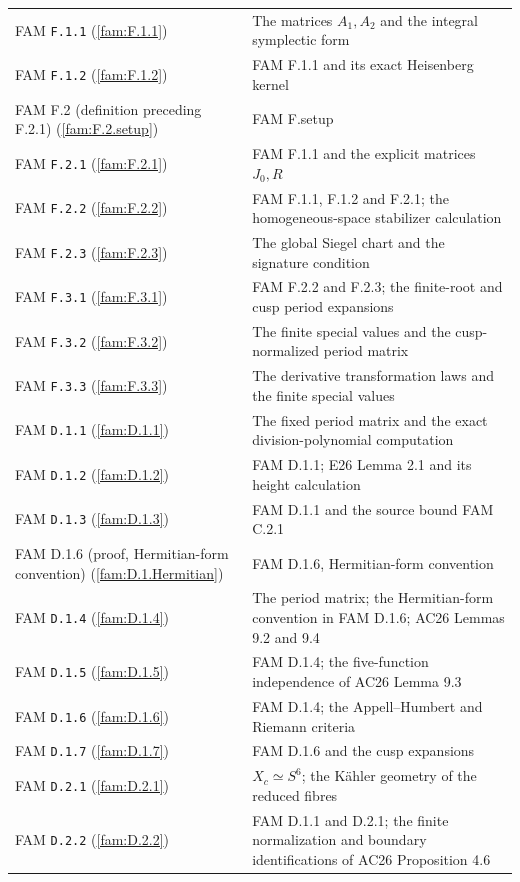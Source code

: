 \begin{longtable}{@{}L{.21\linewidth}L{.73\linewidth}@{}}
FAM \nolinkurl{F.1.1} (\ref{fam:F.1.1}) & The matrices $A_1,A_2$ and the integral symplectic form\\
FAM \nolinkurl{F.1.2} (\ref{fam:F.1.2}) & FAM F.1.1 and its exact Heisenberg kernel\\
FAM F.2 (definition preceding F.2.1) (\ref{fam:F.2.setup}) & FAM F.setup\\
FAM \nolinkurl{F.2.1} (\ref{fam:F.2.1}) & FAM F.1.1 and the explicit matrices $J_0,R$\\
FAM \nolinkurl{F.2.2} (\ref{fam:F.2.2}) & FAM F.1.1, F.1.2 and F.2.1; the homogeneous-space stabilizer calculation\\
FAM \nolinkurl{F.2.3} (\ref{fam:F.2.3}) & The global Siegel chart and the signature condition\\
FAM \nolinkurl{F.3.1} (\ref{fam:F.3.1}) & FAM F.2.2 and F.2.3; the finite-root and cusp period expansions\\
FAM \nolinkurl{F.3.2} (\ref{fam:F.3.2}) & The finite special values and the cusp-normalized period matrix\\
FAM \nolinkurl{F.3.3} (\ref{fam:F.3.3}) & The derivative transformation laws and the finite special values\\
FAM \nolinkurl{D.1.1} (\ref{fam:D.1.1}) & The fixed period matrix and the exact division-polynomial computation\\
FAM \nolinkurl{D.1.2} (\ref{fam:D.1.2}) & FAM D.1.1; E26 Lemma 2.1 and its height calculation\\
FAM \nolinkurl{D.1.3} (\ref{fam:D.1.3}) & FAM D.1.1 and the source bound FAM C.2.1\\
FAM D.1.6 (proof, Hermitian-form convention) (\ref{fam:D.1.Hermitian}) & FAM D.1.6, Hermitian-form convention\\
FAM \nolinkurl{D.1.4} (\ref{fam:D.1.4}) & The period matrix; the Hermitian-form convention in FAM D.1.6; AC26 Lemmas 9.2 and 9.4\\
FAM \nolinkurl{D.1.5} (\ref{fam:D.1.5}) & FAM D.1.4; the five-function independence of AC26 Lemma 9.3\\
FAM \nolinkurl{D.1.6} (\ref{fam:D.1.6}) & FAM D.1.4; the Appell--Humbert and Riemann criteria\\
FAM \nolinkurl{D.1.7} (\ref{fam:D.1.7}) & FAM D.1.6 and the cusp expansions\\
FAM \nolinkurl{D.2.1} (\ref{fam:D.2.1}) & $X_c\simeq S^6$; the K\"ahler geometry of the reduced fibres\\
FAM \nolinkurl{D.2.2} (\ref{fam:D.2.2}) & FAM D.1.1 and D.2.1; the finite normalization and boundary identifications of AC26 Proposition 4.6\\

\end{longtable}
